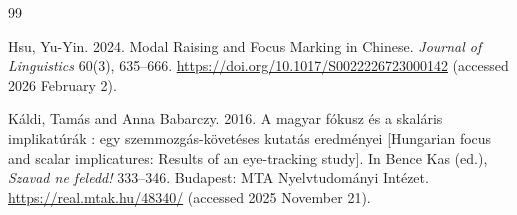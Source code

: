 \documentclass[a4paper, ruler]{CUP-JNL-LIN}%
\begin{document}
\begin{Backmatter}
\begin{thebibliography}{99}

{Hsu, Yu-Yin}. 2024. Modal Raising and Focus Marking in Chinese. \textit{Journal of Linguistics} 60(3), 635--666. \url{https://doi.org/10.1017/S0022226723000142}  (accessed 2026 February 2).




{Káldi, Tamás and Anna Babarczy}. 2016. A magyar fókusz és a skaláris implikatúrák : egy szemmozgás-követéses kutatás eredményei [Hungarian focus and scalar implicatures: Results of an eye-tracking study]. In Bence Kas (ed.), \textit{Szavad ne feledd!} 333--346. Budapest: MTA Nyelvtudományi Intézet. \url{https://real.mtak.hu/48340/} (accessed 2025 November 21).




\end{thebibliography}
\end{Backmatter}
\end{document}
